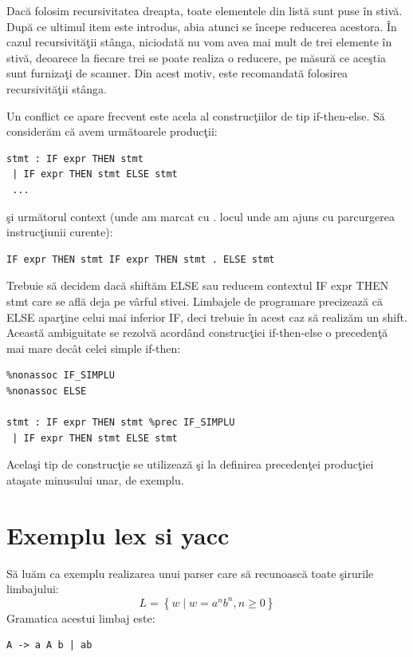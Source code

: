Dac\u{a} folosim recursivitatea dreapta, toate elementele din list\u{a} sunt puse \^{i}n stiv\u{a}. Dup\u{a} ce ultimul item este introdus, abia atunci se \^{i}ncepe reducerea acestora. \^{I}n cazul recursivit\u{a}\c{t}ii st\^{a}nga, niciodat\u{a} nu vom avea mai mult de trei elemente \^{i}n stiv\u{a}, deoarece la fiecare trei se poate realiza o reducere, pe m\u{a}sur\u{a} ce ace\c{s}tia sunt furniza\c{t}i de scanner. Din acest motiv, este recomandat\u{a} folosirea recursivit\u{a}\c{t}ii st\^{a}nga.

Un conflict ce apare frecvent este acela al construc\c{t}iilor de tip if-then-else. S\u{a} consider\u{a}m c\u{a} avem urm\u{a}toarele produc\c{t}ii:

\begin{verbatim}
stmt : IF expr THEN stmt
 | IF expr THEN stmt ELSE stmt
 ...
\end{verbatim}
\c{s}i urm\u{a}torul context (unde am marcat cu . locul unde am ajuns cu parcurgerea instruc\c{t}iunii curente):

\begin{verbatim}
IF expr THEN stmt IF expr THEN stmt . ELSE stmt
\end{verbatim}

Trebuie s\u{a} decidem dac\u{a} shift\u{a}m ELSE sau reducem contextul IF expr THEN stmt care se afl\u{a} deja pe v\^{a}rful stivei. Limbajele de programare precizeaz\u{a} c\u{a} ELSE apar\c{t}ine celui mai inferior IF, deci trebuie \^{i}n acest caz s\u{a} realiz\u{a}m un shift. Aceast\u{a} ambiguitate se rezolv\u{a} acord\^{a}nd construc\c{t}iei if-then-else o preceden\c{t}\u{a} mai mare dec\^{a}t celei simple if-then:

\begin{verbatim}
%nonassoc IF_SIMPLU
%nonassoc ELSE

stmt : IF expr THEN stmt %prec IF_SIMPLU
 | IF expr THEN stmt ELSE stmt
\end{verbatim}

Acela\c{s}i tip de construc\c{t}ie se utilizeaz\u{a} \c{s}i la definirea preceden\c{t}ei produc\c{t}iei ata\c{s}ate minusului unar, de exemplu.

\section{Exemplu lex si yacc}
S\u{a} lu\u{a}m ca exemplu realizarea unui parser care s\u{a} recunoasc\u{a} toate \c{s}irurile limbajului:
\begin{equation}
 L=\left \{ w \mid w = a^{n}b^{n}, n\geqslant 0 \right \}
\end{equation} 
Gramatica acestui limbaj este:
\begin{verbatim}
A -> a A b | ab
\end{verbatim}

